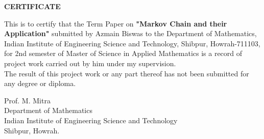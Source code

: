 \vspace{10cm}
\begin{center}
    \LARGE{\textbf{CERTIFICATE}}
\end{center}

\vspace*{2cm}
This is to certify that the Term Paper on \textbf{"Markov Chain and their Application"} submitted by Azmain Biswas to the Department of Mathematics, Indian Institute of Engineering Science and Technology, Shibpur, Howrah-711103, for 2nd semester of Master of Science in Applied Mathematics is a record of project work carried out by him under my supervision. \\
The result of this project work or any part thereof has not been submitted for any degree or diploma.
\vspace{4cm}
\begin{flushright}
    Prof. M. Mitra\\
    Department of Mathematics\\
    Indian Institute of Engineering Science and Technology\\
    Shibpur, Howrah.
\end{flushright}
